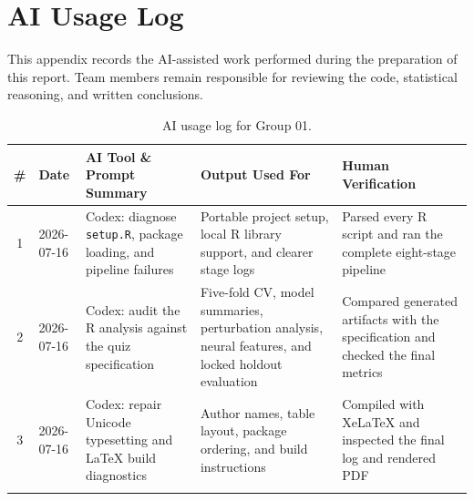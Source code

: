 \section{AI Usage Log}
\label{sec:ai-log}

This appendix records the AI-assisted work performed during the preparation
of this report. Team members remain responsible for reviewing the code,
statistical reasoning, and written conclusions.

\begin{longtable}{c l >{\raggedright\arraybackslash}p{3.5cm} >{\raggedright\arraybackslash}p{3.5cm} >{\raggedright\arraybackslash}p{3cm}}
\toprule
\textbf{\#} &
\textbf{Date} &
\textbf{AI Tool \& Prompt Summary} &
\textbf{Output Used For} &
\textbf{Human Verification} \\
\midrule
\endhead
1 &
2026-07-16 &
Codex: diagnose \texttt{setup.R}, package loading, and pipeline failures &
Portable project setup, local R library support, and clearer stage logs &
Parsed every R script and ran the complete eight-stage pipeline \\[4pt]
2 &
2026-07-16 &
Codex: audit the R analysis against the quiz specification &
Five-fold CV, model summaries, perturbation analysis, neural features, and locked holdout evaluation &
Compared generated artifacts with the specification and checked the final metrics \\[4pt]
3 &
2026-07-16 &
Codex: repair Unicode typesetting and LaTeX build diagnostics &
Author names, table layout, package ordering, and build instructions &
Compiled with XeLaTeX and inspected the final log and rendered PDF \\
\bottomrule
\caption{AI usage log for Group 01.}
\label{tab:ai-log}
\end{longtable}
